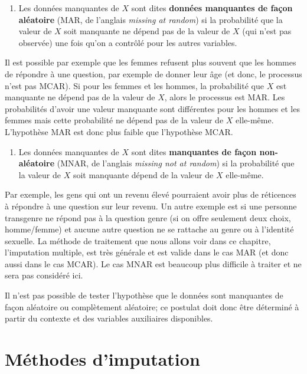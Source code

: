 \documentclass[
  11pt,
  letterpaper,
]{scrbook}
\providecommand{\tightlist}{%
  \setlength{\itemsep}{0pt}\setlength{\parskip}{0pt}}\usepackage{longtable,booktabs,array}
\theoremstyle{definition}
\theoremstyle{remark}
\begin{document}
\begin{enumerate}
\def\labelenumi{\arabic{enumi})}
\setcounter{enumi}{1}
\tightlist
\item
  Les données manquantes de \(X\) sont dites \textbf{données manquantes
  de façon aléatoire} (MAR, de l'anglais \emph{missing at random}) si la
  probabilité que la valeur de \(X\) soit manquante ne dépend pas de la
  valeur de \(X\) (qui n'est pas observée) une fois qu'on a contrôlé
  pour les autres variables.
\end{enumerate}

Il est possible par exemple que les femmes refusent plus souvent que les
hommes de répondre à une question, par exemple de donner leur âge (et
donc, le processus n'est pas MCAR). Si pour les femmes et les hommes, la
probabilité que \(X\) est manquante ne dépend pas de la valeur de \(X\),
alors le processus est MAR. Les probabilités d'avoir une valeur
manquante sont différentes pour les hommes et les femmes mais cette
probabilité ne dépend pas de la valeur de \(X\) elle-même. L'hypothèse
MAR est donc plus faible que l'hypothèse MCAR.

\begin{enumerate}
\def\labelenumi{\arabic{enumi})}
\setcounter{enumi}{2}
\tightlist
\item
  Les données manquantes de \(X\) sont dites \textbf{manquantes de façon
  non-aléatoire} (MNAR, de l'anglais \emph{missing not at random}) si la
  probabilité que la valeur de \(X\) soit manquante dépend de la valeur
  de \(X\) elle-même.
\end{enumerate}

Par exemple, les gens qui ont un revenu élevé pourraient avoir plus de
réticences à répondre à une question sur leur revenu. Un autre exemple
est si une personne transgenre ne répond pas à la question genre (si on
offre seulement deux choix, homme/femme) et aucune autre question ne se
rattache au genre ou à l'identité sexuelle. La méthode de traitement que
nous allons voir dans ce chapitre, l'imputation multiple, est très
générale et est valide dans le cas MAR (et donc aussi dans le cas MCAR).
Le cas MNAR est beaucoup plus difficile à traiter et ne sera pas
considéré ici.

Il n'est pas possible de tester l'hypothèse que le données sont
manquantes de façon aléatoire ou complètement aléatoire; ce postulat
doit donc être déterminé à partir du contexte et des variables
auxiliaires disponibles.

\section{Méthodes d'imputation}\label{muxe9thodes-dimputation}
\end{document}
